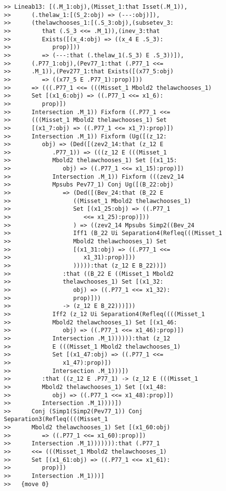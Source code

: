 \documentclass[12pt]{article}
\begin{document}
\begin{verbatim}
>> Lineab13: [(.M_1:obj),(Misset_1:that Isset(.M_1)),
>>      (.thelaw_1:[(S_2:obj) => (---:obj)]),
>>      (thelawchooses_1:[(.S_3:obj),(subsetev_3:
>>         that (.S_3 <<= .M_1)),(inev_3:that
>>         Exists([(x_4:obj) => ((x_4 E .S_3):
>>            prop)]))
>>         => (---:that (.thelaw_1(.S_3) E .S_3))]),
>>      (.P77_1:obj),(Pev77_1:that (.P77_1 <<=
>>      .M_1)),(Pev277_1:that Exists([(x77_5:obj)
>>         => ((x77_5 E .P77_1):prop)]))
>>      => (((.P77_1 <<= (((Misset_1 Mbold2 thelawchooses_1)
>>      Set [(x1_6:obj) => ((.P77_1 <<= x1_6):
>>         prop)])
>>      Intersection .M_1)) Fixform ((.P77_1 <<=
>>      (((Misset_1 Mbold2 thelawchooses_1) Set
>>      [(x1_7:obj) => ((.P77_1 <<= x1_7):prop)])
>>      Intersection .M_1)) Fixform (Ug([(z_12:
>>         obj) => (Ded([(zev2_14:that (z_12 E
>>            .P77_1)) => (((z_12 E (((Misset_1
>>            Mbold2 thelawchooses_1) Set [(x1_15:
>>               obj) => ((.P77_1 <<= x1_15):prop)])
>>            Intersection .M_1)) Fixform (((zev2_14
>>            Mpsubs Pev77_1) Conj Ug([(B_22:obj)
>>               => (Ded([(Bev_24:that (B_22 E
>>                  ((Misset_1 Mbold2 thelawchooses_1)
>>                  Set [(x1_25:obj) => ((.P77_1
>>                     <<= x1_25):prop)]))
>>                  ) => ((zev2_14 Mpsubs Simp2((Bev_24
>>                  Iff1 (B_22 Ui Separation4(Refleq(((Misset_1
>>                  Mbold2 thelawchooses_1) Set
>>                  [(x1_31:obj) => ((.P77_1 <<=
>>                     x1_31):prop)]))
>>                  ))))):that (z_12 E B_22))])
>>               :that ((B_22 E ((Misset_1 Mbold2
>>               thelawchooses_1) Set [(x1_32:
>>                  obj) => ((.P77_1 <<= x1_32):
>>                  prop)]))
>>               -> (z_12 E B_22)))]))
>>            Iff2 (z_12 Ui Separation4(Refleq((((Misset_1
>>            Mbold2 thelawchooses_1) Set [(x1_46:
>>               obj) => ((.P77_1 <<= x1_46):prop)])
>>            Intersection .M_1)))))):that (z_12
>>            E (((Misset_1 Mbold2 thelawchooses_1)
>>            Set [(x1_47:obj) => ((.P77_1 <<=
>>               x1_47):prop)])
>>            Intersection .M_1)))])
>>         :that ((z_12 E .P77_1) -> (z_12 E (((Misset_1
>>         Mbold2 thelawchooses_1) Set [(x1_48:
>>            obj) => ((.P77_1 <<= x1_48):prop)])
>>         Intersection .M_1))))])
>>      Conj (Simp1(Simp2(Pev77_1)) Conj Separation3(Refleq((((Misset_1
>>      Mbold2 thelawchooses_1) Set [(x1_60:obj)
>>         => ((.P77_1 <<= x1_60):prop)])
>>      Intersection .M_1))))))):that (.P77_1
>>      <<= (((Misset_1 Mbold2 thelawchooses_1)
>>      Set [(x1_61:obj) => ((.P77_1 <<= x1_61):
>>         prop)])
>>      Intersection .M_1)))]
>>   {move 0}




\end{verbatim}
\end{document}

